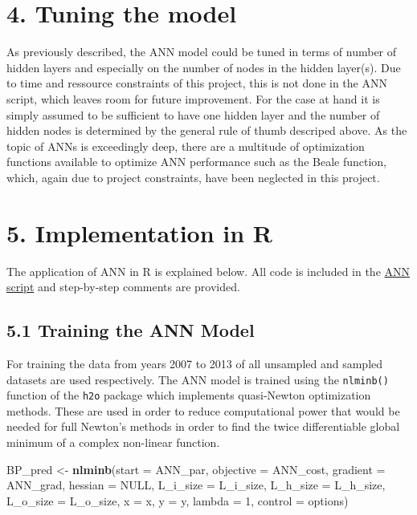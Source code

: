 \documentclass[]{article}
\newenvironment{Shaded}{\begin{snugshade}}{\end{snugshade}}
\newcommand{\DataTypeTok}[1]{\textcolor[rgb]{0.13,0.29,0.53}{#1}}
\newcommand{\DecValTok}[1]{\textcolor[rgb]{0.00,0.00,0.81}{#1}}
\newcommand{\KeywordTok}[1]{\textcolor[rgb]{0.13,0.29,0.53}{\textbf{#1}}}
\newcommand{\NormalTok}[1]{#1}
\newcommand{\OtherTok}[1]{\textcolor[rgb]{0.56,0.35,0.01}{#1}}
\newcommand{\StringTok}[1]{\textcolor[rgb]{0.31,0.60,0.02}{#1}}
\begin{document}
\hypertarget{tuning-the-model}{%
\section{4. Tuning the model}\label{tuning-the-model}}

As previously described, the ANN model could be tuned in terms of number
of hidden layers and especially on the number of nodes in the hidden
layer(s). Due to time and ressource constraints of this project, this is
not done in the ANN script, which leaves room for future improvement.
For the case at hand it is simply assumed to be sufficient to have one
hidden layer and the number of hidden nodes is determined by the general
rule of thumb descriped above. As the topic of ANNs is exceedingly deep,
there are a multitude of optimization functions available to optimize
ANN performance such as the Beale function, which, again due to project
constraints, have been neglected in this project.

\hypertarget{implementation-in-r}{%
\section{5. Implementation in R}\label{implementation-in-r}}

The application of ANN in R is explained below. All code is included in
the
\href{https://github.com/NicSchuler/DSF_NFLDraftPrediction/blob/master/Project_Scripts/ANN.R}{ANN
script} and step-by-step comments are provided.

\hypertarget{training-the-ann-model}{%
\subsection{5.1 Training the ANN Model}\label{training-the-ann-model}}

For training the data from years 2007 to 2013 of all unsampled and
sampled datasets are used respectively. The ANN model is trained using
the \texttt{nlminb()} function of the \texttt{h2o} package which
implements quasi-Newton optimization methods. These are used in order to
reduce computational power that would be needed for full Newton's
methods in order to find the twice differentiable global minimum of a
complex non-linear function.

\begin{Shaded}
\begin{Highlighting}[]
\NormalTok{BP_pred <-}\StringTok{ }\KeywordTok{nlminb}\NormalTok{(}\DataTypeTok{start =}\NormalTok{ ANN_par,}
                 \DataTypeTok{objective =}\NormalTok{ ANN_cost, }
                 \DataTypeTok{gradient =}\NormalTok{ ANN_grad,}
                 \DataTypeTok{hessian =} \OtherTok{NULL}\NormalTok{,}
                 \DataTypeTok{L_i_size =}\NormalTok{ L_i_size,}
                 \DataTypeTok{L_h_size =}\NormalTok{ L_h_size,}
                 \DataTypeTok{L_o_size =}\NormalTok{ L_o_size,}
                 \DataTypeTok{x =}\NormalTok{ x, }\DataTypeTok{y =}\NormalTok{ y,}
                 \DataTypeTok{lambda =} \DecValTok{1}\NormalTok{,}
                 \DataTypeTok{control =}\NormalTok{ options)}
\end{Highlighting}
\end{Shaded}
\end{document}
